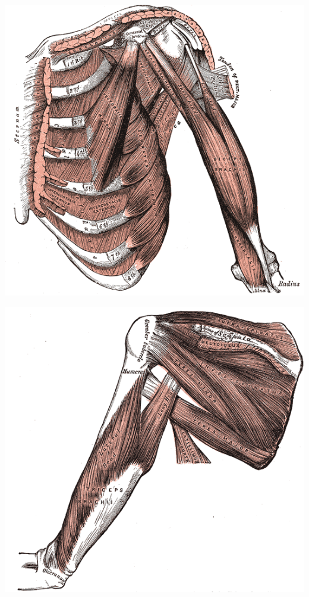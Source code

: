 \documentclass[pdftex,a4paper,11pt]{article}
\numberwithin{equation}{subsection}
\begin{document}
\begin{center}
        \includegraphics[width=.80\linewidth]{fig/Gray411}
\end{center}

\begin{center}
        \includegraphics[width=.80\linewidth]{fig/Gray412}
\end{center}
\end{document}
